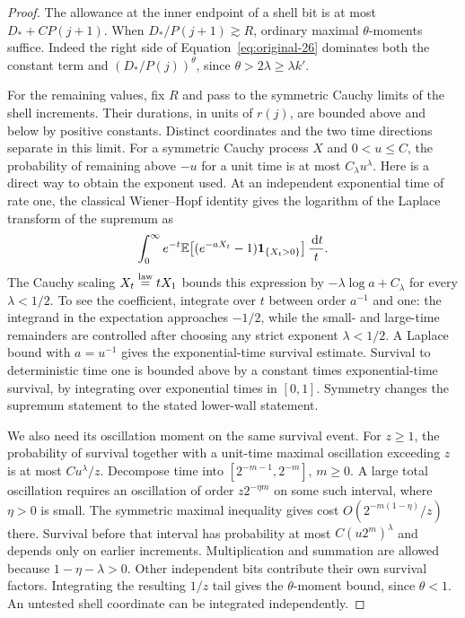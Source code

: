 \begin{proof}
The allowance at the inner endpoint of a shell bit is at most
$D_*+CP(j+1)$.  When $D_*/P(j+1)\gtrsim R$, ordinary maximal
$\theta$-moments suffice.  Indeed the right side of
Equation~\eqref{eq:original-26} dominates both the constant term
and $(D_*/P(j))^\theta$, since $\theta>2\lambda\ge\lambda k'$.

For the remaining values, fix $R$ and pass to the symmetric Cauchy
limits of the shell increments.  Their durations, in units of
$r(j)$, are bounded above and below by positive constants.  Distinct
coordinates and the two time directions separate in this limit.
For a symmetric Cauchy process $X$ and $0<u\le C$, the probability
of remaining above $-u$ for a unit time is at most
$C_\lambda u^\lambda$.  Here is a direct way to obtain the
exponent used.  At an independent exponential time of rate one, the
classical Wiener--Hopf identity
\citep[Chapter~VI, Theorem~5 and Corollary~10]{BertoinLevy} gives the logarithm
of the Laplace transform of the supremum as
\begin{equation}\label{addr:wh-transform}
 \int_0^\infty e^{-t}
   \mathbb E\!\left[(e^{-aX_t}-1)\mathbf 1_{\{X_t>0\}}\right]
                  \frac{\,\mathrm d t}{t}.
\end{equation}
The Cauchy scaling $X_t\overset{\rm law}=tX_1$ bounds this
expression by $-\lambda\log a+C_\lambda$ for every
$\lambda<1/2$.  To see the coefficient, integrate over
$t$ between order $a^{-1}$ and one: the integrand in the
expectation approaches $-1/2$, while the small- and large-time
remainders are controlled after choosing any strict exponent
$\lambda<1/2$.  A Laplace bound with $a=u^{-1}$ gives the
exponential-time survival estimate.  Survival to deterministic
time one is bounded above by a constant times exponential-time
survival, by integrating over exponential times in $[0,1]$.
Symmetry changes the supremum statement to the stated lower-wall
statement.

We also need its oscillation moment on the same survival event.
For $z\ge1$, the probability of survival together with a unit-time
maximal oscillation exceeding $z$ is at most
$Cu^\lambda/z$.  Decompose time into
$[2^{-m-1},2^{-m}]$, $m\ge0$.  A large total oscillation requires
an oscillation of order $z2^{-\eta m}$ on some such interval,
where $\eta>0$ is small.  The symmetric maximal inequality gives
cost $O(2^{-m(1-\eta)}/z)$ there.  Survival before that interval
has probability at most $C(u2^m)^\lambda$ and depends only on
earlier increments.  Multiplication and summation are allowed
because $1-\eta-\lambda>0$.  Other independent bits contribute
their own survival factors.  Integrating the resulting $1/z$ tail
gives the $\theta$-moment bound, since $\theta<1$.  An untested
shell coordinate can be integrated independently.


\end{proof}
